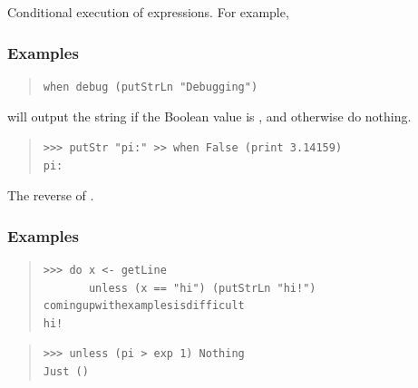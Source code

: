 \begin{haddockdesc}
\item[\begin{tabular}{@{}l}
when :: Applicative f => Bool -> f () -> f ()
\end{tabular}]
{\haddockbegindoc
Conditional execution of  expressions. For example,\par
\subsubsection*{\textbf{Examples}}
\begin{quote}
{\haddockverb\begin{verbatim}
when debug (putStrLn "Debugging")\end{verbatim}}
\end{quote}
will output the string  if the Boolean value 
 is , and otherwise do nothing.\par
\begin{quote}
{\haddockverb\begin{verbatim}
>>> putStr "pi:" >> when False (print 3.14159)
pi:

\end{verbatim}}
\end{quote}}
\end{haddockdesc}
\begin{haddockdesc}
\item[\begin{tabular}{@{}l}
unless :: Applicative f => Bool -> f () -> f ()
\end{tabular}]
{\haddockbegindoc
The reverse of .\par
\subsubsection*{\textbf{Examples}}
\begin{quote}
{\haddockverb\begin{verbatim}
>>> do x <- getLine
       unless (x == "hi") (putStrLn "hi!")
comingupwithexamplesisdifficult
hi!

\end{verbatim}}
\end{quote}
\begin{quote}
{\haddockverb\begin{verbatim}
>>> unless (pi > exp 1) Nothing
Just ()

\end{verbatim}}
\end{quote}}
\end{haddockdesc}
